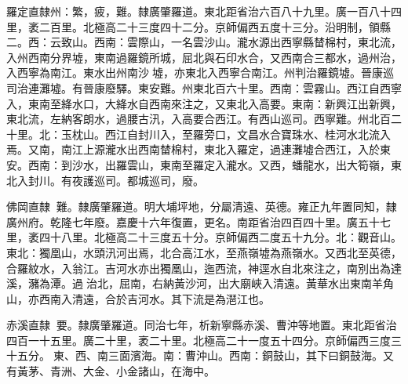 \begin{pinyinscope}
羅定直隸州：繁，疲，難。隸廣肇羅道。東北距省治六百八十九里。廣一百八十四里，袤二百里。北極高二十三度四十二分。京師偏西五度十三分。沿明制，領縣二。西：云致山。西南：雲際山，一名雲沙山。瀧水源出西寧縣榃棉村，東北流，入州西南分界墟，東南過羅鏡所城，屈北與石印水合，又西南合三都水，過州治，入西寧為南江。東水出州南沙墟，亦東北入西寧合南江。州判治羅鏡墟。晉康巡司治連灘墟。有晉康廢驛。東安難。州東北百六十里。西南：雲霧山。西江自西寧入，東南至絳水口，大絳水自西南來注之，又東北入高要。東南：新興江出新興，東北流，左納客朗水，過腰古汛，入高要合西江。有西山巡司。西寧難。州北百二十里。北：玉枕山。西江自封川入，至羅旁口，文昌水合寶珠水、桂河水北流入焉。又南，南江上源瀧水出西南榃棉村，東北入羅定，過連灘墟合西江，入於東安。西南：到沙水，出羅雲山，東南至羅定入瀧水。又西，蟠龍水，出大筍嶺，東北入封川。有夜護巡司。都城巡司，廢。

佛岡直隸：難。隸廣肇羅道。明大埔坪地，分屬清遠、英德。雍正九年置同知，隸廣州府。乾隆七年廢。嘉慶十六年復置，更名。南距省治四百四十里。廣五十七里，袤四十八里。北極高二十三度五十分。京師偏西二度五十九分。北：觀音山。東北：獨凰山，水頭汛河出焉，北合高江水，至燕嶺墟為燕嶺水。又西北至英德，合羅紋水，入翁江。吉河水亦出獨凰山，迤西流，神逕水自北來注之，南別出為達溪，瀦為潭。過治北，屈南，右納黃沙河，出大廟峽入清遠。黃華水出東南羊角山，亦西南入清遠，合於吉河水。其下流是為潖江也。

赤溪直隸：要。隸廣肇羅道。同治七年，析新寧縣赤溪、曹沖等地置。東北距省治四百一十五里。廣二十里，袤二十里。北極高二十一度五十四分。京師偏西三度三十五分。東、西、南三面濱海。南：曹沖山。西南：銅鼓山，其下曰銅鼓海。又有黃茅、青洲、大金、小金諸山，在海中。


\end{pinyinscope}
